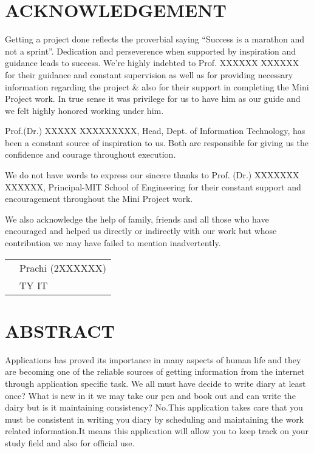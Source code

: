 \documentclass[12pt,a4paper]{report}
\begin{document}
\chapterfont{\centering}
\chapter *{ACKNOWLEDGEMENT}
\large 
Getting a project done reflects the proverbial saying “Success is a marathon and not a sprint”. Dedication and perseverence when supported by inspiration and guidance leads to success. We’re highly indebted to Prof. XXXXXX XXXXXX for their guidance and constant supervision as well as for providing necessary information regarding the project & also for their support in completing the Mini Project work. In true sense it was privilege for us to have him as our guide and we felt highly honored working under him.
\par
Prof.(Dr.) XXXXX XXXXXXXXX, Head, Dept. of Information Technology, has been a constant source of inspiration to us. Both are responsible for giving us the confidence and courage throughout execution. 
\par
We do not have words to express our sincere thanks to Prof. (Dr.) XXXXXXX XXXXXX, Principal-MIT School of Engineering for their constant support and encouragement throughout the Mini Project work.
\par
We also acknowledge the help of family, friends and all those who have encouraged and helped us directly or indirectly with our work but whose contribution we may have failed to mention inadvertently. 

\vspace{5cm}



\begin{tabular}{p{1cm}>{\raggedleft\arraybackslash}p{11.5cm}}
& Prachi (2XXXXXX) \\

 & TY IT \\
 \end{tabular}

\tableofcontents



\chapter*{\textbf{ABSTRACT}}

\Large	
{}
Applications has proved its importance in many aspects of human life and they are becoming one of the reliable sources of getting information from the internet through application specific task. We all must have decide to write diary at least once? What is new in it we may take our pen and book out and can write the dairy but is it maintaining consistency? No.This application takes care that you must be consistent in writing you diary by scheduling and maintaining the work related information.It means this application will allow you to keep track on your study field and also for official use.
 
\end{document}
